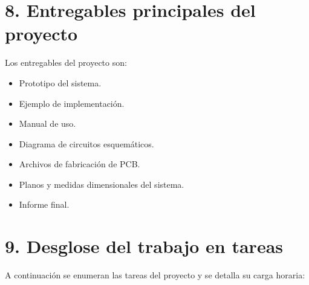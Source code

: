 \documentclass[
11pt, %
codirector, %
]{charter}
\begin{document}
\section{8. Entregables principales del proyecto}
\label{sec:entregables}

Los entregables del proyecto son:

\begin{itemize}

	\item Prototipo del sistema.
	\item Ejemplo de implementación.
	\item Manual de uso.
	\item Diagrama de circuitos esquemáticos.
	\item Archivos de fabricación de PCB.
	\item Planos y medidas dimensionales del sistema.
	\item Informe final.

\end{itemize}

\section{9. Desglose del trabajo en tareas}
\label{sec:wbs}

A continuación se enumeran las tareas del proyecto y se detalla su carga horaria:
\end{document}
